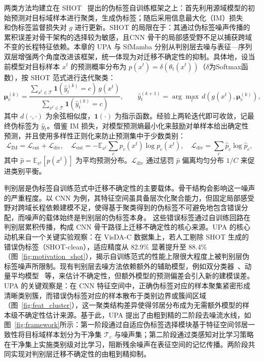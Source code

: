 两类方法均建立在 SHOT~\cite{liang2021source} 提出的伪标签自训练框架之上：首先利用源域模型的初始预测对目标域样本进行聚类，生成伪标签；随后采用信息最大化（IM）损失~\cite{gomes2010discriminative} 和伪标签监督损失对 $g$ 进行更新。SHOT 的局限在于：其通过伪标签噪声传播的累积误差对骨干架构的选择较为敏感，且CNN 骨干的局部感受野不足以捕获跨域不变的长程特征依赖。本章的 UPA 与 SfMamba 分别从判别层去噪与表征—序列双层增强两个角度改进该框架，统一体现为对迁移不确定性的抑制。具体地，设当前模型对目标样本 $x^t$ 的预测概率分布为 $p(x^t) = \delta(\theta_t(x^t))$（$\delta$为Softmax函数），按 SHOT 范式进行迭代聚类：
\begin{equation}
\boldsymbol{\mu}^{(k)}_c = \frac{\sum_{x^t \in \mathcal{T}} \mathbf{1}(\hat{y}^{(k)}_t = c) \, g(x^t)}{\sum_{x^t \in \mathcal{T}} \mathbf{1}(\hat{y}^{(k)}_t = c)}, \qquad
\hat{y}^{(k+1)}_t = \arg\max_c \, d\!\left(g(x^t), \boldsymbol{\mu}^{(k)}_c\right),
\label{eq:chap2_proto}
\end{equation}
其中 $d(\cdot, \cdot)$ 为余弦相似度，$\mathbf{1}(\cdot)$ 为指示函数。经验上两轮迭代即可收敛，记最终伪标签为 $\hat{y}_t$。借鉴 IM 损失，对模型预测熵最小化来鼓励对单样本给出确定性预测，并且使用多样性正则化来防止预测集中于少数类别：
\begin{equation}
\mathcal{L}_{\text{IM}} = \mathcal{L}_{\text{ent}} + \mathcal{L}_{\text{div}}, \quad
\mathcal{L}_{\text{ent}} = -\mathbb{E}_{x^t} \sum_c p_c(x^t) \log p_c(x^t), \quad
\mathcal{L}_{\text{div}} = \sum_c \hat{p}_c \log \hat{p}_c,
\label{eq:chap2_im}
\end{equation}
其中 $\hat{p} = \mathbb{E}_{x^t}[p(x^t)]$ 为平均预测分布。$\mathcal{L}_{\text{div}}$ 通过惩罚 $\hat{p}$ 偏离均匀分布 $1/C$ 来促进类别平衡。

判别层是伪标签自训练范式中迁移不确定性的主要载体。骨干结构会影响这一噪声的严重程度。以 CNN 为例，其特征空间虽具备层次化聚合能力，但固定局部感受野对跨域长程依赖建模不足，使得基于聚类得到的伪标签不可避免地包含错误分配，而噪声的载体始终是判别层的伪标签本身。
这些错误标签通过自训练回路在判别层累积传播，构成 CNN 骨干路径上迁移不确定性的核心来源。UPA 的核心动机来自一个关键实验观察：在 VisDA-C 数据集上，若人工剔除 SHOT 生成的错误伪标签（SHOT-clean），适应精度从 82.9\% 显著提升至 88.4\%（图~\ref{fig:motivation_shot}），揭示自训练范式的性能上限很大程度上被判别层伪标签噪声所限制。现有判别层去噪方法依赖额外的辅助模型，例如双分类器~\cite{liang2021source}、动量平均模型~\cite{tarvainen2017mean} 等，来估计不确定性，但额外模型的预测偏差会引入新的建模误差。UPA 的关键观察是：在 CNN 特征空间中，正确伪标签对应的样本聚集紧密形成清晰类别簇，而错误伪标签对应的样本散布于类别边界或簇间区域（图~\ref{fig:feat_cluster}），这一聚类结构差异使得邻居分布成为无需额外模型的样本级不确定性估计来源。基于此，UPA 提出了由粗到精的二阶段去噪流水线，如图~\ref{fig:framework}所示：第一阶段通过自适应伪标签选择模块基于特征空间邻居一致性将目标域样本划分为干净集 $\mathcal{T}_c$ 与噪声集；第二阶段通过类感知对比学习策略在干净集上实施类别级对比学习，阻断残余噪声在表征空间的记忆传播。两阶段共同实现对判别层迁移不确定性的由粗到精抑制。

